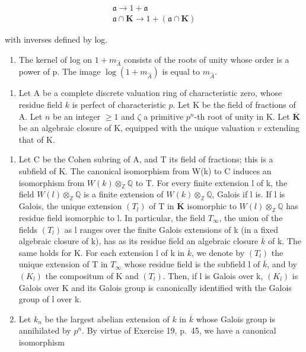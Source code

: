 \[
\begin{array}{l}\mathfrak {a} \rightarrow 1 + \mathfrak {a}\\\mathfrak {a} \cap \mathbf {K} \rightarrow 1 + (\mathfrak {a} \cap \mathbf {K})\end{array}
\]

with inverses defined by log.

\begin{enumerate}
\def\labelenumi{\alph{enumi})}
\setcounter{enumi}{3}
\tightlist
\item
  The kernel of log on \(1 + m_{\hat{A}}\) consists of the roots of unity whose order is a power of p. The image \(\log(1 + m_{\hat{A}})\) is equal to \(m_{\hat{A}}\).
\end{enumerate}

\begin{enumerate}
\def\labelenumi{\arabic{enumi})}
\setcounter{enumi}{13}
\tightlist
\item
  Let A be a complete discrete valuation ring of characteristic zero, whose residue field \(k\) is perfect of characteristic \(p\). Let K be the field of fractions of A. Let \(n\) be an integer \(\geqslant 1\) and \(\zeta\) a primitive \(p^n\)-th root of unity in K. Let \(\overline{\mathbf{K}}\) be an algebraic closure of K, equipped with the unique valuation \(v\) extending that of K.
\end{enumerate}

\begin{enumerate}
\def\labelenumi{\alph{enumi})}
\item
  Let C be the Cohen subring of A, and T its field of fractions; this is a subfield of K. The canonical isomorphism from W(k) to C induces an isomorphism from \(W(k) \otimes_{\mathbb{Z}} \mathbb{Q}\) to T. For every finite extension l of k, the field \(W(l) \otimes_{\mathbb{Z}} \mathbb{Q}\) is a finite extension of \(W(k) \otimes_{\mathbb{Z}} \mathbb{Q}\), Galois if l is. If l is Galois, the unique extension \((T_l)\) of T in \(\overline{\mathbf{K}}\) isomorphic to \(W(l) \otimes_{\mathbb{Z}} \mathbb{Q}\) has residue field isomorphic to l. In particular, the field \(T_{\infty}\), the union of the fields \((T_l)\) as l ranges over the finite Galois extensions of k (in a fixed algebraic closure of k), has as its residue field an algebraic closure \(\overline{k}\) of k. The same holds for K. For each extension l of k in \(\overline{k}\), we denote by \((T_l)\) the unique extension of T in \(T_{\infty}\) whose residue field is the subfield l of \(\overline{k}\), and by \((K_l)\) the compositum of K and \((T_l)\). Then, if l is Galois over k, \((K_l)\) is Galois over K and its Galois group is canonically identified with the Galois group of l over k.
\item
  Let \(k_n\) be the largest abelian extension of \(k\) in \(\overline{k}\) whose Galois group is annihilated by \(p^n\). By virtue of Exercise 19, p.~45, we have a canonical isomorphism
\end{enumerate}

